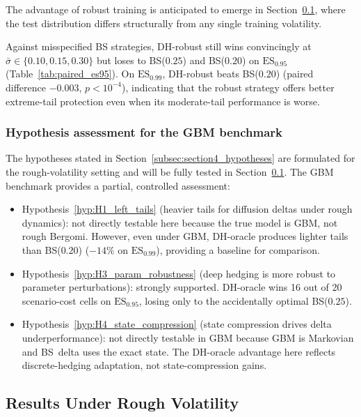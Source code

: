 \documentclass[12pt,a4paper]{article}
\theoremstyle{definition}
\theoremstyle{plain}
\theoremstyle{remark}
\theoremstyle{plain}
\begin{document}
The advantage of robust training is anticipated to emerge in
Section~\ref{subsec:results_rough_vol}, where the test distribution
differs structurally from any single training volatility.
 
Against misspecified BS strategies, DH-robust still wins convincingly
at $\bar\sigma \in \{0.10, 0.15, 0.30\}$ but loses to BS($0.25$) and
BS($0.20$) on $\mathrm{ES}_{0.95}$
(Table~\ref{tab:paired_es95}).
On $\mathrm{ES}_{0.99}$, DH-robust beats BS($0.20$)
(paired difference $-0.003$, $p < 10^{-4}$), indicating that
the robust strategy offers better extreme-tail protection even when
its moderate-tail performance is worse.
 
\subsubsection*{Hypothesis assessment for the GBM benchmark}
 
The hypotheses stated in Section~\ref{subsec:section4_hypotheses}
are formulated for the rough-volatility setting and will be fully
tested in Section~\ref{subsec:results_rough_vol}.
The GBM benchmark provides a partial, controlled assessment:
 
\begin{itemize}
  \item Hypothesis~\ref{hyp:H1_left_tails} (heavier tails for
        diffusion deltas under rough dynamics):
        not directly testable here because the true model is
        GBM, not rough Bergomi.
        However, even under GBM, DH-oracle produces lighter
        tails than BS($0.20$) ($-14\%$ on $\mathrm{ES}_{0.99}$),
        providing a baseline for comparison.
 
  \item Hypothesis~\ref{hyp:H3_param_robustness} (deep hedging is
        more robust to parameter perturbations):
        strongly supported.
        DH-oracle wins 16 out of 20 scenario-cost cells on
        $\mathrm{ES}_{0.95}$, losing only to the accidentally
        optimal BS($0.25$).
 
  \item Hypothesis~\ref{hyp:H4_state_compression} (state
        compression drives delta underperformance):
        not directly testable in GBM because GBM is Markovian
        and BS~delta uses the exact state.
        The DH-oracle advantage here reflects discrete-hedging
        adaptation, not state-compression gains.
\end{itemize}
 
\subsection{Results Under Rough Volatility}
\label{subsec:results_rough_vol}
\end{document}
